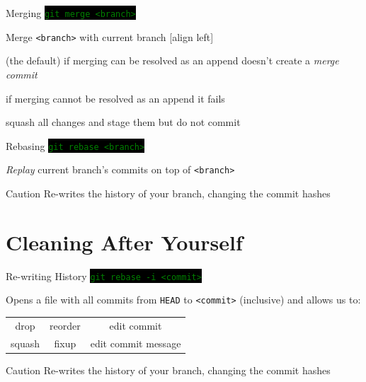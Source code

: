 \documentclass[
14pt,
aspectratio=169,
usenames,
dvipsnames,
x11names]{beamer}
\newcommand{\code}[1]{{\small\colorbox{black}{\textcolor{green}{\texttt{#1}}}}}
\begin{document}
\begin{frame}{Merging}
  \code{git merge <branch>}

  Merge \texttt{<branch>} with current branch
  [align left]
  \begin{description}[<+->] \setlength{\itemsep}{\fill}
  \item[\texttt{--ff~~~~~}] (the \alert{default}) if merging can be resolved as an append doesn't create a \textit{merge commit}
  \item[\texttt{--ff-only}] if merging cannot be resolved as an append it fails
  \item[\texttt{--squash~}] squash all changes and stage them but do not commit
  \end{description}

\end{frame}

\begin{frame}{Rebasing}
  \code{git rebase <branch>}

  \textit{Replay} current branch's commits on top of \texttt{<branch>}

  \vfill
  \pause

  \begin{alertblock}{Caution}
    Re-writes the history of your branch, changing the commit hashes
  \end{alertblock}
\end{frame}

\section{Cleaning After Yourself}

\begin{frame}{Re-writing History}
  \code{git rebase -i <commit>}

  Opens a file with all commits from \texttt{HEAD} to \texttt{<commit>} (inclusive) and allows us to:
  \begin{center}
    \def\arraystretch{1.5}
    \setlength\tabcolsep{2em}
    \begin{tabular}{c c c}
      drop   & reorder & edit commit \\
      squash & fixup   & edit commit message
    \end{tabular}
  \end{center}

  \begin{alertblock}{Caution}
    Re-writes the history of your branch, changing the commit hashes
  \end{alertblock}
\end{frame}
\end{document}
